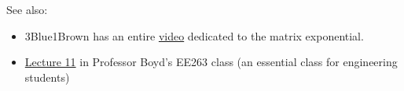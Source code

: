 \documentclass[11pt, oneside]{article}   	%
\begin{document}
See also:
\begin{itemize}
\item 3Blue1Brown has an entire \href{https://youtu.be/O85OWBJ2ayo}{video} dedicated to the matrix exponential.
\item \href{https://www.youtube.com/watch?v=5ePa2UOkEV0&list=PL06960BA52D0DB32B}{Lecture 11} in Professor Boyd's EE263 class
(an essential class for engineering students)
\end{itemize}
\end{document}
